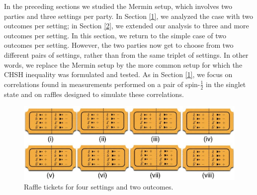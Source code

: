 
In the preceding sections we studied the Mermin setup, which involves two parties and three settings per party. In Section \ref{1}, we analyzed the case with two outcomes per setting; in Section \ref{2}, we extended our analysis to three and more outcomes per setting. In this section, we return to the simple case of two outcomes per setting. However, the two parties now get to choose from two different pairs of settings, rather than from the same triplet of settings. In other words, we replace the Mermin setup by the more common setup for which the CHSH inequality \citep{CHSH} was formulated and tested. As in Section \ref{1}, we focus on correlations found in measurements performed on a pair of spin-$\frac12$ in the singlet state and on raffles designed to simulate these correlations. 

\begin{figure}[ht]
 \centering
   \includegraphics[width=4.5in]{raffle-tickets-4set2out-i-thru-viii.jpeg} 
   \caption{Raffle tickets for four settings and two outcomes.}
   \label{raffle-tickets-4set2out-i-thru-viii}
\end{figure}

